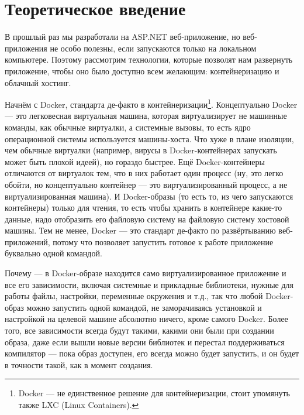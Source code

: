 \documentclass{../../text-style}
\begin{document}
\maketitle
\thispagestyle{empty}

\section{Теоретическое введение}

В прошлый раз мы разработали на ASP.NET веб-приложение, но веб-приложения не особо полезны, если запускаются только на локальном компьютере. Поэтому рассмотрим технологии, которые позволят нам развернуть приложение, чтобы оно было доступно всем желающим: контейнеризацию и облачный хостинг.

Начнём с Docker, стандарта де-факто в контейнеризации\footnote{Docker --- не единственное решение для контейнеризации, стоит упомянуть также LXC (Linux Containers).}. Концептуально Docker --- это легковесная виртуальная машина, которая виртуализирует не машинные команды, как обычные виртуалки, а системные вызовы, то есть ядро операционной системы используется машины-хоста. Что хуже в плане изоляции, чем обычные виртуалки (например, вирусы в Docker-контейнерах запускать может быть плохой идеей), но гораздо быстрее. Ещё Docker-контейнеры отличаются от виртуалок тем, что в них работает один процесс (ну, это легко обойти, но концептуально контейнер --- это виртуализированный процесс, а не виртуализированная машина). И Docker-образы (то есть то, из чего запускаются контейнеры) только для чтения, то есть чтобы хранить в контейнере какие-то данные, надо отобразить его файловую систему на файловую систему хостовой машины. Тем не менее, Docker --- это стандарт де-факто по развёртыванию веб-приложений, потому что позволяет запустить готовое к работе приложение буквально одной командой. 

Почему --- в Docker-образе находится само виртуализированное приложение и все его зависимости, включая системные и прикладные библиотеки, нужные для работы файлы, настройки, переменные окружения и т.д., так что любой Docker-образ можно запустить одной командой, не заморачиваясь установкой и настройкой на целевой машине абсолютно ничего, кроме самого Docker. Более того, все зависимости всегда будут такими, какими они были при создании образа, даже если вышли новые версии библиотек и перестал поддерживаться компилятор --- пока образ доступен, его всегда можно будет запустить, и он будет в точности такой, как в момент создания.
\end{document}
